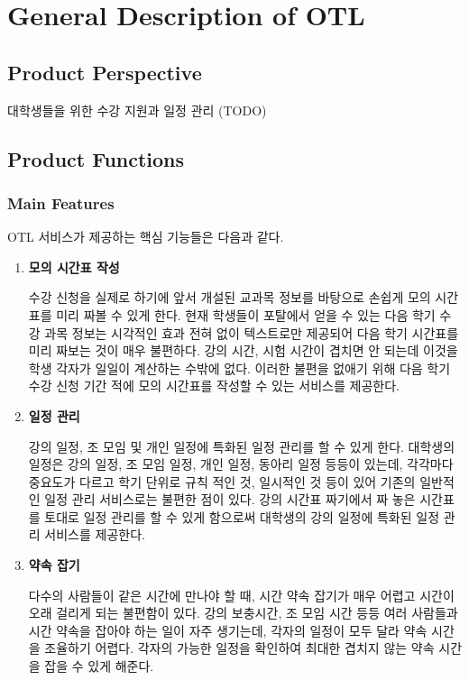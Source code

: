 \documentclass[a4paper,titlepage]{article}
\begin{document}
\pagebreak
\section{General Description of OTL}
\subsection{Product Perspective}

대학생들을 위한 수강 지원과 일정 관리 (TODO)

\subsection{Product Functions}
\subsubsection{Main Features}
OTL 서비스가 제공하는 핵심 기능들은 다음과 같다.
\begin{enumerate}
	\item\textbf{모의 시간표 작성}

	수강 신청을 실제로 하기에 앞서 개설된 교과목 정보를 바탕으로 손쉽게 모의 시간표를 미리 짜볼 수 있게 한다.
	현재 학생들이 포탈에서 얻을 수 있는 다음 학기 수강 과목 정보는 시각적인 효과 전혀 없이 텍스트로만 제공되어 다음 학기 시간표를 미리 짜보는 것이 매우 불편하다.
	강의 시간, 시험 시간이 겹치면 안 되는데 이것을 학생 각자가 일일이 계산하는 수밖에 없다.
	이러한 불편을 없애기 위해 다음 학기 수강 신청 기간 적에 모의 시간표를 작성할 수 있는 서비스를 제공한다.

	\item\textbf{일정 관리}

	강의 일정, 조 모임 및 개인 일정에 특화된 일정 관리를 할 수 있게 한다.
	대학생의 일정은 강의 일정, 조 모임 일정, 개인 일정, 동아리 일정 등등이 있는데, 각각마다 중요도가 다르고 학기 단위로 규칙 적인 것, 일시적인 것 등이 있어 기존의 일반적인 일정 관리 서비스로는 불편한 점이 있다.
	강의 시간표 짜기에서 짜 놓은 시간표를 토대로 일정 관리를 할 수 있게 함으로써 대학생의 강의 일정에 특화된 일정 관리 서비스를 제공한다. 

	\item\textbf{약속 잡기}

	다수의 사람들이 같은 시간에 만나야 할 때, 시간 약속 잡기가 매우 어렵고 시간이 오래 걸리게 되는 불편함이 있다.
	강의 보충시간, 조 모임 시간 등등 여러 사람들과 시간 약속을 잡아야 하는 일이 자주 생기는데, 각자의 일정이 모두 달라 약속 시간을 조율하기 어렵다.
	각자의 가능한 일정을 확인하여 최대한 겹치지 않는 약속 시간을 잡을 수 있게 해준다.

\end{enumerate}
\end{document}
